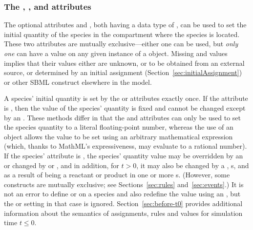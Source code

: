 \subsubsection{The ,
  , and  attributes}
\label{sec:initialAmount}
\label{sec:species-substanceunits}

The optional attributes  and
, both having a data type of
, can be used to set the initial quantity of the
species in the compartment where the species is located.  These
two attributes are mutually exclusive---either one can be used,
but \emph{only one} can have a value on any given instance of a
\Species object.  Missing  and
 values implies that their values
either are unknown, or to be obtained from an external source, or
determined by an initial assignment
(Section~\ref{sec:initialAssignment}) or other SBML construct
elsewhere in the model.

A species' initial quantity is set by the  or
 attributes exactly once.  If the
 attribute is , then the value of the
species' quantity is fixed and cannot be changed except by an
\InitialAssignment.  These methods differ in that the
 and  attributes
can only be used to set the species quantity to a literal
floating-point number, whereas the use of an \InitialAssignment
object allows the value to be set using an arbitrary mathematical
expression (which, thanks to MathML's expressiveness, may evaluate
to a rational number).  If the species'  attribute
is , the species' quantity value may be overridden by
an \InitialAssignment or changed by \AssignmentRule or
\AlgebraicRule, and in addition, for $t > 0$, it may also be
changed by a \RateRule, \Event{}s, and as a result of being a
reactant or product in one or more \Reaction{}s.  (However, some
constructs are mutually exclusive; see Sections~\ref{sec:rules}
and~\ref{sec:events}.)  It is not an error to define
 or  on a species
and also redefine the value using an \InitialAssignment, but the
 or  setting in
that case is ignored.  Section~\ref{sec:before-t0} provides
additional information about the semantics of assignments, rules
and values for simulation time $t \leq 0$.

